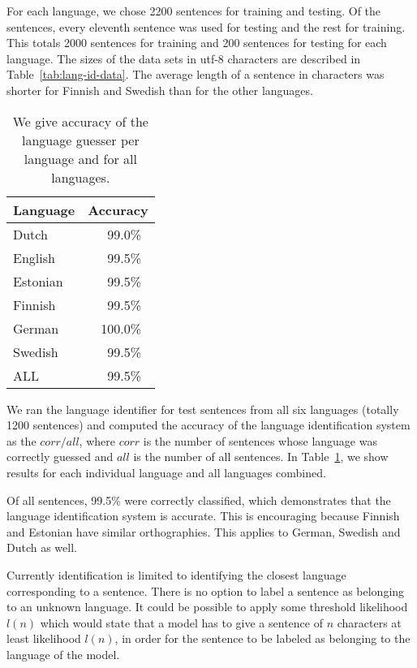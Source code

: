 \documentclass{llncs}
\begin{document}
For each language, we chose 2200 sentences for training and
testing. Of the sentences, every eleventh sentence was used for
testing and the rest for training. This totals 2000 sentences for
training and 200 sentences for testing for each language. The sizes of
the data sets in utf-8 characters are described in
Table~\ref{tab:lang-id-data}. The average length of a sentence in
characters was shorter for Finnish and Swedish than for the other
languages.

\begin{table}
\begin{center}
\begin{tabular}{l|l}
Language & Accuracy\\
\hline
Dutch    & ~~~99.0\%\\
English  & ~~~99.5\%\\
Estonian & ~~~99.5\%\\
Finnish  & ~~~99.5\%\\
German   & ~~100.0\%\\
Swedish  & ~~~99.5\%\\
\hline
ALL      & ~~~99.5\%
\end{tabular}
\caption{We give accuracy of the language guesser per language and for
  all languages.}\label{tab:lang-id-acc}
\end{center}
\end{table}

We ran the language identifier for test sentences from all six
languages (totally 1200 sentences) and computed the accuracy of the
language identification system as the $corr / all$, where $corr$ is
the number of sentences whose language was correctly guessed and $all$
is the number of all sentences. In Table~\ref{tab:lang-id-acc}, we
show results for each individual language and all languages
combined. 

Of all sentences, 99.5\% were correctly classified, which demonstrates
that the language identification system is accurate. This is
encouraging because Finnish and Estonian have similar
orthographies. This applies to German, Swedish and Dutch as well.

Currently identification is limited to identifying the closest
language corresponding to a sentence. There is no option to label a
sentence as belonging to an unknown language. It could be possible to
apply some threshold likelihood $l(n)$ which would state that a model
has to give a sentence of $n$ characters at least likelihood $l(n)$,
in order for the sentence to be labeled as belonging to the language
of the model. 
\end{document}
